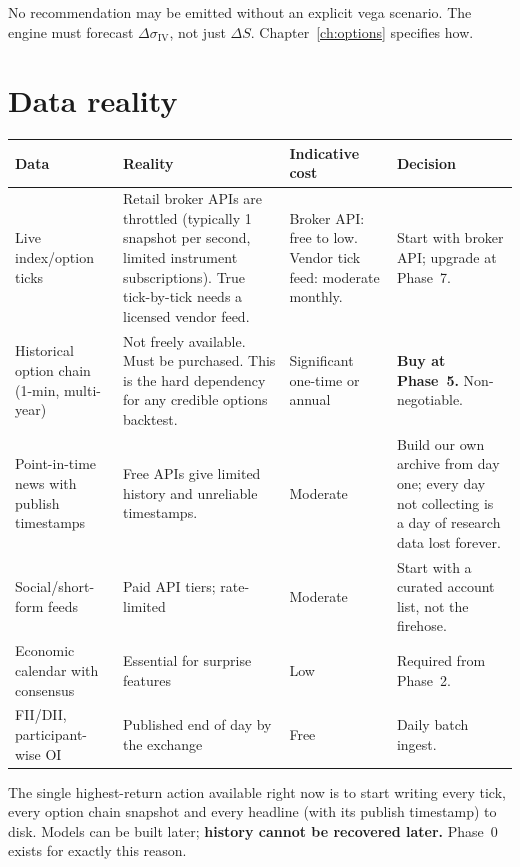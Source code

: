 \begin{warnbox}[title={Rule}]
No recommendation may be emitted without an explicit vega scenario. The engine
must forecast $\Delta \sigma_{\text{IV}}$, not just $\Delta S$. Chapter~\ref{ch:options}
specifies how.
\end{warnbox}

\section{Data reality}

\begin{longtable}{@{}p{3.6cm}p{4.2cm}p{3.0cm}p{3.4cm}@{}}
\toprule
\textbf{Data} & \textbf{Reality} & \textbf{Indicative cost} & \textbf{Decision}\\
\midrule
Live index/option ticks & Retail broker APIs are throttled (typically 1
snapshot per second, limited instrument subscriptions). True tick-by-tick needs
a licensed vendor feed. & Broker API: free to low. Vendor tick feed: moderate
monthly. & Start with broker API; upgrade at Phase~7.\\
Historical option chain (1-min, multi-year) & Not freely available. Must be
purchased. This is the hard dependency for any credible options backtest. &
Significant one-time or annual & \textbf{Buy at Phase~5.} Non-negotiable.\\
Point-in-time news with publish timestamps & Free APIs give limited history and
unreliable timestamps. & Moderate & Build our own archive from day one; every
day not collecting is a day of research data lost forever.\\
Social/short-form feeds & Paid API tiers; rate-limited & Moderate & Start with
a curated account list, not the firehose.\\
Economic calendar with consensus & Essential for surprise features & Low &
Required from Phase~2.\\
FII/DII, participant-wise OI & Published end of day by the exchange & Free &
Daily batch ingest.\\
\bottomrule
\end{longtable}

\begin{keybox}[title={Start collecting today}]
The single highest-return action available right now is to start writing every
tick, every option chain snapshot and every headline (with its publish
timestamp) to disk. Models can be built later; \textbf{history cannot be
recovered later.} Phase~0 exists for exactly this reason.
\end{keybox}

